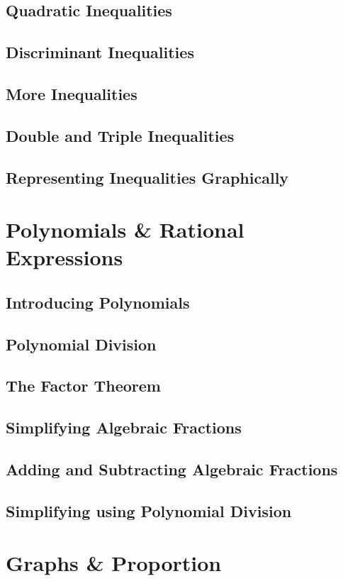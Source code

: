 \documentclass[../maths.tex]{subfiles}
\begin{document}
\subsection*{Quadratic Inequalities}
\subsection*{Discriminant Inequalities}
\subsection*{More Inequalities}
\subsection*{Double and Triple Inequalities}
\subsection*{Representing Inequalities Graphically}
\section{Polynomials \& Rational Expressions}
\subsection*{Introducing Polynomials}
\subsection*{Polynomial Division}
\subsection*{The Factor Theorem}
\subsection*{Simplifying Algebraic Fractions}
\subsection*{Adding and Subtracting Algebraic Fractions}
\subsection*{Simplifying using Polynomial Division}
\section{Graphs \& Proportion}
\end{document}
